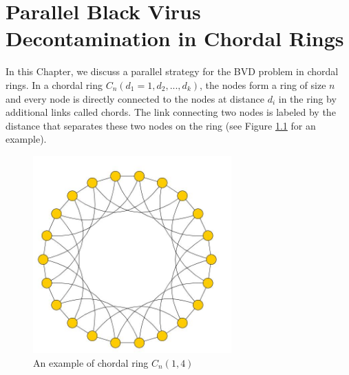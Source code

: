 


\chapter {Parallel Black Virus Decontamination in Chordal Rings}
\label{TL}
 

In this Chapter, we discuss a parallel strategy for  the BVD problem in chordal rings. In a  chordal ring $C_n(d_1=1, d_2, ..., d_k)$, the nodes form a ring of size $n$ and every node is directly connected to the nodes at distance $d_i$ in the ring by additional links called chords. The link connecting two nodes is labeled by the distance that separates these two nodes on the ring (see Figure \ref{fig:chordalring} for an example).
 
\begin{figure}[H]
  \centering  
  \includegraphics[width=3in]{figures/chordalring.png}
  \caption{An example of chordal ring $C_n(1,4)$}\label{fig:chordalring}
\end{figure}

